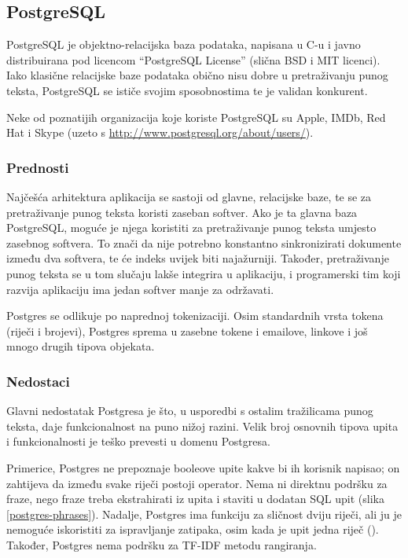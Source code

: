 \documentclass[a4paper,twoside,12pt]{scrreprt}
\begin{document}
\subsection{PostgreSQL}

PostgreSQL je objektno-relacijska baza podataka, napisana u C-u i javno distribuirana pod licencom ``PostgreSQL License'' (slična BSD i MIT licenci). Iako klasične relacijske baze podataka obično nisu dobre u pretraživanju punog teksta, PostgreSQL se ističe svojim sposobnostima te je validan konkurent.

Neke od poznatijih organizacija koje koriste PostgreSQL su Apple, IMDb, Red Hat i Skype (uzeto s \url{http://www.postgresql.org/about/users/}).

\subsubsection{Prednosti}

Najčešća arhitektura aplikacija se sastoji od glavne, relacijske baze, te se za pretraživanje punog teksta koristi zaseban softver. Ako je ta glavna baza PostgreSQL, moguće je njega koristiti za pretraživanje punog teksta umjesto zasebnog softvera. To znači da nije potrebno konstantno sinkronizirati dokumente između dva softvera, te će indeks uvijek biti najažurniji. Također, pretraživanje punog teksta se u tom slučaju lakše integrira u aplikaciju, i programerski tim koji razvija aplikaciju ima jedan softver manje za održavati.

Postgres se odlikuje po naprednoj tokenizaciji. Osim standardnih vrsta tokena (riječi i brojevi), Postgres sprema u zasebne tokene i emailove, linkove i još mnogo drugih tipova objekata.

\subsubsection{Nedostaci}

Glavni nedostatak Postgresa je što, u usporedbi s ostalim tražilicama punog teksta, daje funkcionalnost na puno nižoj razini. Velik broj osnovnih tipova upita i funkcionalnosti je teško prevesti u domenu Postgresa.

Primerice, Postgres ne prepoznaje booleove upite kakve bi ih korisnik napisao; on zahtijeva da između svake riječi postoji operator. Nema ni direktnu podršku za fraze, nego fraze treba ekstrahirati iz upita i staviti u dodatan SQL upit (slika \ref{postgres-phrases}). Nadalje, Postgres ima funkciju za sličnost dviju riječi, ali ju je nemoguće iskoristiti za ispravljanje zatipaka, osim kada je upit jedna riječ (\cite{goodenough}). Također, Postgres nema podršku za TF-IDF metodu rangiranja.
\end{document}

